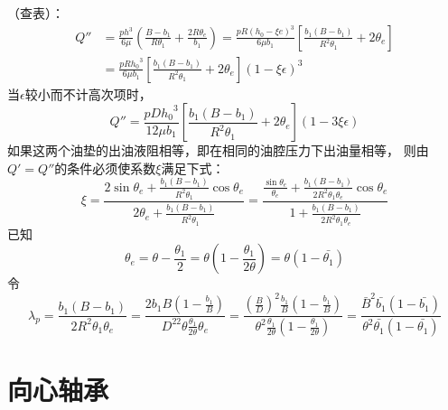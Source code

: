 \documentclass[UTF8, 12pt]{ctexbook}
\begin{document}
（查表）：
\begin{equation*}
\begin{aligned}
    Q''
    &=\frac{ph^3}{6\mu}
        \left(
            \frac{B-b_1}{R\theta_1}+\frac{2R\theta_e}{b_1}
        \right)
    =\frac{pR(h_0-\xi e)^3}{6\mu b_1}
        \left[ 
            \frac{b_1(B-b_1)}{R^2\theta_1}+2\theta_e
        \right]\\
    &=\frac{pR{h_0}^3}{6\mu b_1}
        \left[
            \frac{b_1(B-b_1)}{R^2\theta_1}+2\theta_e
        \right](1-\xi\epsilon)^3
\end{aligned}
\end{equation*}
当$\epsilon$较小而不计高次项时，
\begin{equation*}
    Q''=\frac{pD{h_0}^3}{12\mu b_1}
        \left[
            \frac{b_1(B-b_1)}{R^2\theta_1}+2\theta_e
        \right](1-3\xi\epsilon)
\end{equation*}
如果这两个油垫的出油液阻相等，即在相同的油腔压力下出油量相等，
则由$Q'=Q''$的条件必须使系数$\xi$满足下式：
\begin{equation}
    \xi
    =\frac{
            2\sin\theta_e+\frac{b_1(B-b_1)}{R^2\theta_1}\cos\theta_e
        }{
            2\theta_e+\frac{b_1(B-b_1)}{R^2\theta_1}
        }
    =\frac{
        \frac{\sin\theta_e}{\theta_e}
        +\frac{b_1(B-b_1)}{2R^2\theta_1\theta_e}\cos\theta_e
    }{
        1+\frac{b_1(B-b_1)}{2R^2\theta_1\theta_e}
    }
\end{equation}
已知
\begin{equation*}
    \theta_e
    =\theta-\frac{\theta_1}{2}
    =\theta\left(1-\frac{\theta_1}{2\theta}\right)
    =\theta(1-\bar{\theta_1})
\end{equation*}
令
\begin{equation}
    \lambda_p
    =\frac{b_1(B-b_1)}{2R^2\theta_1\theta_e}
    =\frac{
            2b_1B\left(1-\frac{b_1}{B}\right)
        }{
            D^22\theta\frac{\theta_1}{2\theta}\theta_e
        } 
    =\frac{
            \left(\frac{B}{D}\right)^2\frac{b_1}{B}
                \left(1-\frac{b_1}{B}\right)
        }{
            \theta^2\frac{\theta_1}{2\theta}
                \left(1-\frac{\theta_1}{2\theta}\right)
        }
    =\frac{
            \bar{B}^2\bar{b_1}\left( 1 - \bar{b_1} \right)
        }{
            \theta^2\bar{\theta_1}(1-\bar{\theta_1})
        }
\end{equation}
\chapter{向心轴承}
\end{document}
